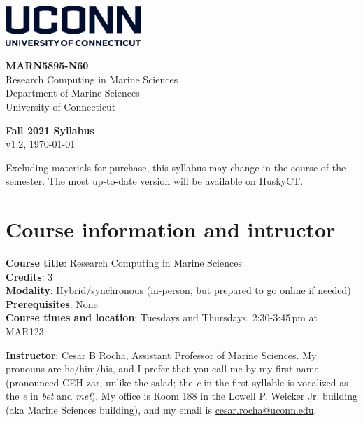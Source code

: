 \documentclass[11pt]{article}
\begin{document}
\parbox{.5\linewidth}
{
\begin{flushleft}
\includegraphics[height=0.6in]{uconn-wordmark-stacked-blue}\\
\vspace{1em}
\end{flushleft}
}
\parbox{.5\linewidth}
{
\begin{flushright}
{\bf MARN5895-N60 }\\
    Research Computing in Marine Sciences\\
    \vspace{.1cm}
{\footnotesize Department of Marine Sciences\\
University of Connecticut\\
}
\end{flushright}
}

\vspace{1em}

%
%
\begin{center}
\textbf{Fall 2021 Syllabus}\\
{\footnotesize v1.2, \today}
\end{center}
\vspace{-.6cm}
{\footnotesize Excluding materials for purchase, this syllabus may change in the course of the semester. The most up-to-date version will be available on HuskyCT.}

\section*{Course information and intructor}

\textbf{Course title}:  Research Computing in Marine Sciences\\
\textbf{Credits}:  3\\
\textbf{Modality}:  Hybrid/synchronous (in-person, but prepared to go online if needed)\\
\textbf{Prerequisites}:  None\\
\textbf{Course times and location}: Tuesdays and Thursdays, 2:30-3:45\,pm at MAR123.

\bigskip

\textbf{Instructor}: Cesar B Rocha, Assistant Professor  of Marine Sciences. My
pronouns are he/him/his, and I prefer that you call me by my first name (pronounced
{CEH-zar}, unlike the salad; the \emph{e} in the first syllable is vocalized
as the \textit{e} in \emph{bet} and \emph{met}).  My office is Room 188 in the
Lowell P. Weicker Jr. building (aka Marine Sciences building), and my email is  \href{mailto:cesar.rocha@uconn.edu}{cesar.rocha@uconn.edu}.
\end{document}
